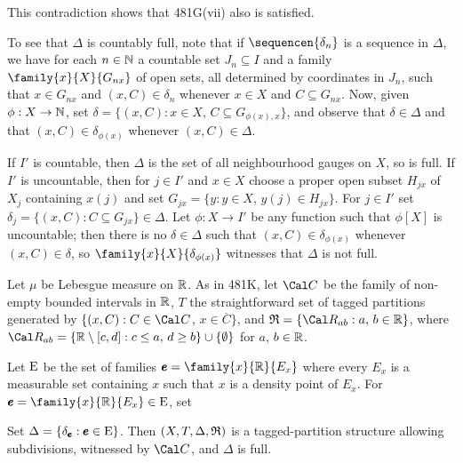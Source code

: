 {This contradiction shows that 481G(vii) also is satisfied.

To see that $\Delta$ is countably full, note that if $\sequencen{\delta_n}$
is a sequence in $\Delta$, we have for each $n\in\Bbb N$ a countable set
$J_n\subseteq I$ and a family $\family{x}{X}{G_{nx}}$ of open sets, all
determined by coordinates in $J_n$, such
that $x\in G_{nx}$ and $(x,C)\in\delta_n$ whenever $x\in X$ and
$C\subseteq G_{nx}$.   Now, given $\phi:X\to\Bbb N$, set
$\delta=\{(x,C):x\in X$, $C\subseteq G_{\phi(x),x}\}$, and observe that
$\delta\in\Delta$ and that $(x,C)\in\delta_{\phi(x)}$ whenever
$(x,C)\in\Delta$.

If $I'$ is countable, then $\Delta$ is the set of all neighbourhood gauges
on $X$, so is full.   If $I'$ is uncountable, then for $j\in I'$ and
$x\in X$ choose a proper open subset $H_{jx}$ of $X_j$ containing
$x(j)$ and set $G_{jx}=\{y:y\in X$, $y(j)\in H_{jx}\}$.   For $j\in I'$ set
$\delta_j=\{(x,C):C\subseteq G_{jx}\}\in\Delta$.   Let $\phi:X\to I'$ be
any function such that $\phi[X]$ is uncountable;
then there is no $\delta\in\Delta$ such that
$(x,C)\in\delta_{\phi(x)}$ whenever $(x,C)\in\delta$, so
$\family{x}{X}{\delta_{\phi(x)}}$ witnesses that $\Delta$ is not full.
}%

 Let $\mu$ be
Leb\discretionary{-}{}{}esgue
measure on $\Bbb R$.   As in 481K, let $\Cal C$ be the family of
non-empty bounded intervals in $\Bbb R$, $T$
the straightforward set of tagged partitions generated by
$\{(x,C):C\in\Cal C$, $x\in\overline{C}\}$, and
$\frak R=\{\Cal R_{ab}:a,\,b\in\Bbb R\}$, where
$\Cal R_{ab}=\{\Bbb R\setminus[c,d]:c\le a,\,d\ge b\}\cup\{\emptyset\}$
for $a$, $b\in\Bbb R$.

   Let $\text{E}$ be the
set of families $\pmb{e}=\family{x}{\Bbb R}{E_x}$ where every $E_x$ is a
measurable set containing $x$ such that $x$ is a density point of
$E_x$.   For
$\pmb{e}=\family{x}{\Bbb R}{E_x}\in\Epsilon$, set


\noindent Set $\Delta=\{\delta_{\pmb{e}}:\pmb{e}\in\text{E}\}$.   Then
$(X,T,\Delta,\frak R)$ is a tagged-partition structure allowing
subdivisions, witnessed by $\Cal C$, and $\Delta$ is full.

